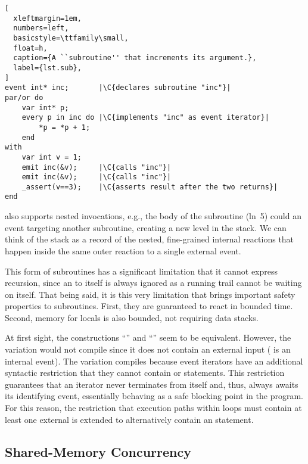 \begin{lstlisting}[
  xleftmargin=1em,
  numbers=left,
  basicstyle=\ttfamily\small,
  float=h,
  caption={A ``subroutine'' that increments its argument.},
  label={lst.sub},
]
event int* inc;       |\C{declares subroutine "inc"}|
par/or do
    var int* p;
    every p in inc do |\C{implements "inc" as event iterator}|
        *p = *p + 1;
    end
with
    var int v = 1;
    emit inc(&v);     |\C{calls "inc"}|
    emit inc(&v);     |\C{calls "inc"}|
    _assert(v==3);    |\C{asserts result after the two returns}|
end
\end{lstlisting}


\CEU also supports nested  invocations, e.g., the body of the
subroutine  (ln~5) could  an event targeting another
subroutine, creating a new level in the stack.
%
We can think of the stack as a record of the nested, fine-grained internal
reactions that happen inside the same outer reaction to a single external
event.

This form of subroutines has a significant limitation that it cannot express
recursion, since an  to itself is always ignored as a running trail
cannot be waiting on itself.
%
That being said, it is this very limitation that brings important safety
properties to subroutines.
%
First, they are guaranteed to react in bounded time.
%
Second, memory for locals is also bounded, not requiring data stacks.

At first sight, the constructions ``'' and
``'' seem to be equivalent.
However, the  variation would not compile since it does not contain
an external input  ( is an internal event).
%
The  variation compiles because event iterators have an additional
syntactic restriction that they cannot contain  or 
statements.
This restriction guarantees that an iterator never terminates from itself and,
thus, always awaits its identifying event, essentially behaving as a safe
blocking point in the program.
%
For this reason, the restriction that execution paths within loops must
contain at least one external  is extended to alternatively contain
an  statement.

\subsection{Shared-Memory Concurrency}
\label{sec.ceu.shared}

